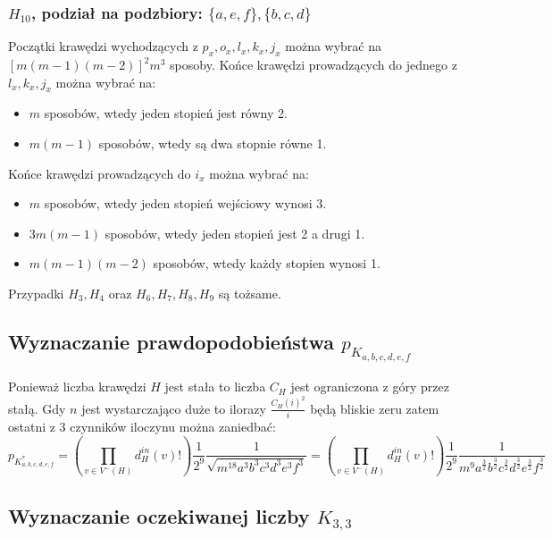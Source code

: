 \documentclass{article}
\begin{document}
\subsubsection{$H_{10}$, podział na podzbiory: $\{ a,e,f \}, \{ b,c,d \}$}
Początki krawędzi wychodzących z $p_x, o_x, l_x, k_x, j_x$ można wybrać na $[m(m-1)(m-2)]^2m^3$ sposoby. Końce krawędzi prowadzących do jednego z $l_x, k_x, j_x$ można wybrać na:
\begin{itemize}
  \item $m$ sposobów, wtedy jeden stopień jest równy 2.
  \item $m(m-1)$ sposobów, wtedy są dwa stopnie równe 1.
\end{itemize}
Końce krawędzi prowadzących do $i_x$ można wybrać na:
\begin{itemize}
  \item $m$ sposobów, wtedy jeden stopień wejściowy wynosi 3.
  \item $3m(m-1)$ sposobów, wtedy jeden stopień jest 2 a drugi 1.
  \item $m(m-1)(m-2)$ sposobów, wtedy każdy stopien wynosi 1.
\end{itemize}
Przypadki $H_3, H_4$ oraz $H_6, H_7, H_8, H_9$ są tożsame.

\subsection{Wyznaczanie prawdopodobieństwa $p_{K_{a,b,c,d,e,f}}$}
Ponieważ liczba krawędzi $H$ jest stała to liczba $C_H$ jest ograniczona z góry przez stałą.
Gdy $n$ jest wystarczająco duże to ilorazy $\frac{C_H(i)^2}{i}$ będą bliskie zeru zatem ostatni z 3 czynników iloczynu można zaniedbać:
\begin{dmath}
  p_{K_{a,b,c,d,e,f}^*} = (\prod_{v \in V^{-}(H)} d_{H}^{in}(v)!) \frac{1}{2^{9}} \frac{1}{\sqrt{m^{18} a^3 b^3 c^3 d^3 e^3 f^3}} 
  = (\prod_{v \in V^{-}(H)} d_{H}^{in}(v)!) \frac{1}{2^{9}} \frac{1}{m^{9} a^{\frac{3}{2}} b^{\frac{3}{2}} c^{\frac{3}{2}} d^{\frac{3}{2}} e^{\frac{3}{2}} f^{\frac{3}{2}}}
\end{dmath} 

\subsection{Wyznaczanie oczekiwanej liczby $K_{3,3}$}
\end{document}

